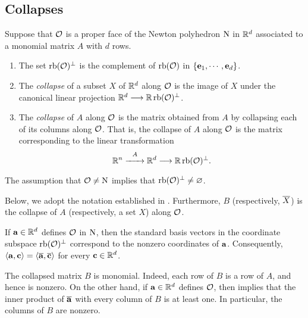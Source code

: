 \documentclass[11pt]{amsart}
\begin{document}
\subsection{Collapses} 


\begin{definition}  
\label{collapse: D}
 Suppose that $\mathcal{O}$ is a proper face of the Newton polyhedron $\mathrm{N}$ in $\mathbb{R}^d$ associated to a monomial matrix $A$ with $d$ rows.  

\begin{enumerate}
\item The set $\operatorname{rb}(\mathcal{O})^{\perp}$ is the complement of $\operatorname{rb}(\mathcal{O})$ in $\{ \mathbf{e}_1, \cdots, \mathbf{e}_d \}$.
\item The \emph{collapse} of a subset $X$ of $\mathbb{R}^d$ along $\mathcal{O}$ is the image of $X$ under the canonical linear projection $\mathbb{R}^d \longrightarrow \mathbb{R} \operatorname{rb}(\mathcal{O})^{\perp}$.
\item The \emph{collapse} of $A$ along $\mathcal{O}$ is the matrix obtained from $A$ by collapsing each of its columns along $\mathcal{O}$.  That is, the collapse of $A$ along $\mathcal{O}$ is the matrix corresponding to the linear transformation  
%
\[ \mathbb{R}^n \stackrel{A}{\xrightarrow{\hspace*{6mm}}} \mathbb{R}^d \longrightarrow \mathbb{R} \operatorname{rb}(\mathcal{O})^{\perp}.\]  
%
\end{enumerate}
\end{definition}     

\begin{remark}  The assumption that $\mathcal{O} \neq \mathrm{N}$ implies that $\operatorname{rb}(\mathcal{O})^{\perp} \neq \varnothing$.
\end{remark}

Below, we adopt the notation established in .  Furthermore,  $B$ (respectively, $\overline{X}$) is the collapse of $A$ (respectively, a set $X$) along $\mathcal{O}$.


\begin{remark}
\label{collapse of a defining vector: R}
If $\mathbf{a} \in \mathbb{R}^d$ defines $\mathcal{O}$ in $\mathrm{N}$, then the standard basis vectors in the coordinate subspace $\operatorname{rb}(\mathcal{O})^{\perp}$ correspond to the nonzero coordinates of $\mathbf{a}$.  Consequently, $\langle \mathbf{a}, \mathbf{c} \rangle = \langle \overline{\mathbf{a}}, \overline{\mathbf{c}} \rangle$ for every $\mathbf{c} \in \mathbb{R}^d$.
\end{remark}

\begin{remark}
\label{collapse of monomial is monomial: R}
The collapsed matrix $B$ is monomial.  Indeed, each row of $B$ is a row of $A$, and hence is nonzero.   On the other hand, if $\mathbf{a} \in \mathbb{R}^d$ defines $\mathcal{O}$, then  implies that the inner product of $\overline{\mathbf{a}}$ with every column of $B$ is at least one.  In particular, the columns of $B$ are nonzero.
\end{remark}
\end{document}
